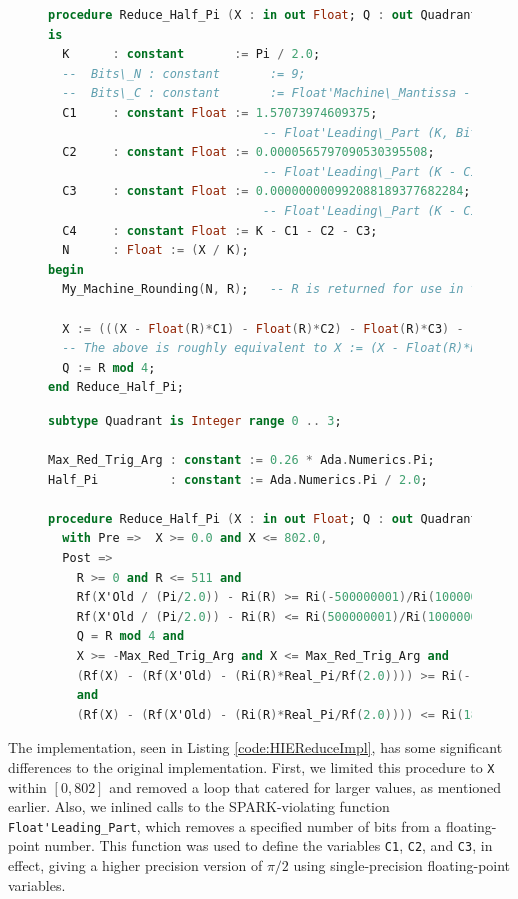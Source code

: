 \documentclass[runningheads]{llncs}
\begin{document}
\begin{figure}[ht]
\vspace{-2ex}
\begin{lstlisting}[caption=Reduce\_Half\_Pi Implementation, language=ada, label={code:HIEReduceImpl},basicstyle=\fontsize{7.5}{9pt}\tt]
procedure Reduce_Half_Pi (X : in out Float; Q : out Quadrant; R : out Integer) 
is
  K      : constant       := Pi / 2.0;
  --  Bits\_N : constant       := 9;
  --  Bits\_C : constant       := Float'Machine\_Mantissa - Bits\_N;
  C1     : constant Float := 1.57073974609375; 
                              -- Float'Leading\_Part (K, Bits\_C);
  C2     : constant Float := 0.0000565797090530395508; 
                              -- Float'Leading\_Part (K - C1, Bits\_C);
  C3     : constant Float := 0.000000000992088189377682284; 
                              -- Float'Leading\_Part (K - C1 - C2, Bits\_C);
  C4     : constant Float := K - C1 - C2 - C3;
  N      : Float := (X / K); 
begin
  My_Machine_Rounding(N, R);   -- R is returned for use in the specification
  
  X := (((X - Float(R)*C1) - Float(R)*C2) - Float(R)*C3) - Float(R)*C4;
  -- The above is roughly equivalent to X := (X - Float(R)*K);
  Q := R mod 4;
end Reduce_Half_Pi;
\end{lstlisting}
  
\begin{lstlisting}[caption=Reduce\_Half\_Pi Specification, language=ada, label={code:HIEReduceSpec},basicstyle=\fontsize{7.5}{9pt}\tt]
subtype Quadrant is Integer range 0 .. 3;

Max_Red_Trig_Arg : constant := 0.26 * Ada.Numerics.Pi;
Half_Pi          : constant := Ada.Numerics.Pi / 2.0;

procedure Reduce_Half_Pi (X : in out Float; Q : out Quadrant; R : out Integer)
  with Pre =>  X >= 0.0 and X <= 802.0,
  Post => 
    R >= 0 and R <= 511 and
    Rf(X'Old / (Pi/2.0)) - Ri(R) >= Ri(-500000001)/Ri(1000000000) and
    Rf(X'Old / (Pi/2.0)) - Ri(R) <= Ri(500000001)/Ri(1000000000) and
    Q = R mod 4 and 
    X >= -Max_Red_Trig_Arg and X <= Max_Red_Trig_Arg and
    (Rf(X) - (Rf(X'Old) - (Ri(R)*Real_Pi/Rf(2.0)))) >= Ri(-18)/Ri(100000) 
    and
    (Rf(X) - (Rf(X'Old) - (Ri(R)*Real_Pi/Rf(2.0)))) <= Ri(18)/Ri(100000);    
\end{lstlisting}
\vspace{-2ex}
\end{figure}

The implementation, seen in Listing \ref{code:HIEReduceImpl}, has some significant differences to the original implementation.
First, we limited this procedure to \lstinline{X} within $[0, 802]$ and removed a loop that catered for larger values, as mentioned earlier.
Also, we inlined calls to the SPARK-violating function \lstinline{Float'Leading_Part}, which removes a specified number of bits from a floating-point number.
This function was used to define the variables \lstinline{C1}, \lstinline{C2}, and \lstinline{C3}, in effect, giving a higher precision version of $\pi / 2$ using single-precision floating-point variables.
\end{document}
